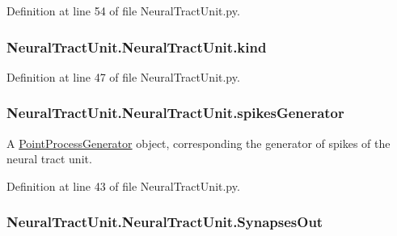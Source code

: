 Definition at line 54 of file Neural\+Tract\+Unit.\+py.

\subsubsection[{\texorpdfstring{kind}{kind}}]{\setlength{\rightskip}{0pt plus 5cm}Neural\+Tract\+Unit.\+Neural\+Tract\+Unit.\+kind}\hypertarget{class_neural_tract_unit_1_1_neural_tract_unit_a29dce2584fbb4bd98199c05bdc767bf1}{}\label{class_neural_tract_unit_1_1_neural_tract_unit_a29dce2584fbb4bd98199c05bdc767bf1}


Definition at line 47 of file Neural\+Tract\+Unit.\+py.

\subsubsection[{\texorpdfstring{spikes\+Generator}{spikesGenerator}}]{\setlength{\rightskip}{0pt plus 5cm}Neural\+Tract\+Unit.\+Neural\+Tract\+Unit.\+spikes\+Generator}\hypertarget{class_neural_tract_unit_1_1_neural_tract_unit_a57cbb130e004fb3f7ee8d8a540f7dff0}{}\label{class_neural_tract_unit_1_1_neural_tract_unit_a57cbb130e004fb3f7ee8d8a540f7dff0}


A \hyperlink{namespace_point_process_generator}{Point\+Process\+Generator} object, corresponding the generator of spikes of the neural tract unit. 



Definition at line 43 of file Neural\+Tract\+Unit.\+py.

\subsubsection[{\texorpdfstring{Synapses\+Out}{SynapsesOut}}]{\setlength{\rightskip}{0pt plus 5cm}Neural\+Tract\+Unit.\+Neural\+Tract\+Unit.\+Synapses\+Out}\hypertarget{class_neural_tract_unit_1_1_neural_tract_unit_a740d2cfa17ad57c7dbd40fbafc654b95}{}\label{class_neural_tract_unit_1_1_neural_tract_unit_a740d2cfa17ad57c7dbd40fbafc654b95}


